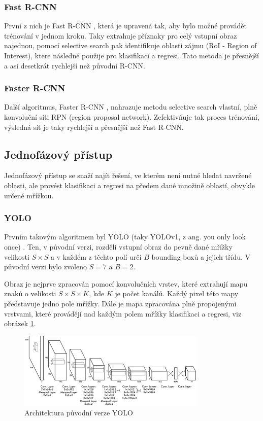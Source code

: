 \subsubsection{Fast R-CNN}
První z nich je Fast R-CNN \cite{fast-r-cnn}, která je upravená tak, aby bylo
možné provádět trénování v jednom kroku. Taky extrahuje příznaky pro celý
vstupní obraz najednou, pomocí selective search pak identifikuje oblasti zájmu
(RoI - Region of Interest), ktere následně použije pro klasifikaci a regresi.
Tato metoda je přesnější a asi desetkrát rychlejší než původní R-CNN.

\subsubsection{Faster R-CNN}
Další algoritmus, Faster R-CNN \cite{faster-r-cnn}, nahrazuje metodu selective
search vlastní, plně konvoluční síti RPN (region proposal network).
Zefektivňuje tak proces trénování, výsledná síť je taky rychlejší a přesnější
než Fast R-CNN.

\subsection{Jednofázový přístup}

Jednofázový přístup se snaží najít řešení, ve kterém není nutné hledat navržené
oblasti, ale provést klasifikaci a regresi na předem dané množině oblastí,
obvykle určené mřížkou.

\subsubsection{YOLO}
Prvním takovým algoritmem byl YOLO (taky YOLOv1, z ang. you only look once)
\cite{yolo}. Ten, v původní verzi, rozdělí vstupní obraz do pevně dané mřížky
velikosti $S \times S$ a v každém z těchto polí určí $B$ bounding boxů a jejich
třídu. V původní verzi bylo zvoleno $S = 7$ a $B = 2$.

Obraz je nejprve zpracován pomocí konvolučních vrstev, které extrahují mapu
znaků o velikosti $S \times S \times K$, kde $K$ je počet kanálů. Každý pixel
této mapy představuje jedno pole mřížky. Dále je mapa zpracována plně
propojenými vrstvami, které provádějí nad každým polem mřížky klasifikaci a
regresi, viz obrázek \ref{fig:yolo}.

\begin{figure}[]
    \centering
    \includegraphics[width=0.8\textwidth]{Figures/yolo}
    \caption{Architektura původní verze YOLO \cite{yolo}}
    \label{fig:yolo}
\end{figure}

